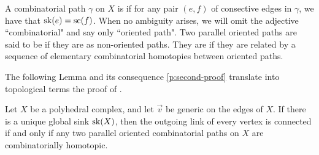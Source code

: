 A combinatorial path $\gamma$ on $X$ is  if for any pair $(e, f)$ of consective edges in $\gamma$, we have that $\mathrm{sk}(e)=\mathrm{sc}(f)$.  
When no ambiguity arises, we will omit the adjective ``combinatorial" and say only ``oriented path".
Two parallel oriented paths are said to be  if they are as non-oriented paths. 
They are  if they are related by a sequence of elementary combinatorial homotopies between oriented paths. 

The following Lemma and its consequence \cref{p:second-proof} translate into topological terms the proof of \cite[Theorem 3.1]{MacLane63}.

\begin{lemma}
\label{l:oriented}
    Let $X$ be a polyhedral complex, and let $\vec v$ be generic on the edges of $X$. 
    If there is a unique global sink $\mathrm{sk}(X)$, then the outgoing link of every vertex is  connected if and only if any two parallel oriented combinatorial paths on $X$ are combinatorially homotopic.
\end{lemma}

